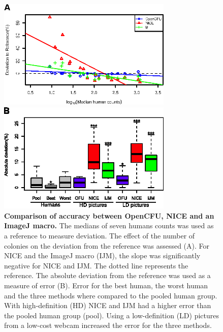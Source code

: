 \documentclass[10pt]{article}
\newcommand{\n}{seven}
\newcommand{\IJM}{IJM}
\begin{document}
\begin{figure}[!ht]
\begin{center}
\includegraphics[width=3.27in]{./figAccuracy/fig3A.eps}

\includegraphics[width=3.27in]{./figAccuracy/fig3B.eps}

\end{center}

\caption{{\bf Comparison of accuracy between OpenCFU, NICE\cite{clarke_lowcost_2010} and  an ImageJ macro\cite{cai_optimized_2011}.} 
The medians of \n{} humans counts was used as a reference to measure deviation. The effect of
the number of colonies on the deviation from the reference was assessed (A). For NICE and the ImageJ macro (\IJM), the
slope was significantly negative for NICE and \IJM{}. The dotted line represents the reference.
The absolute deviation from the reference was used as a measure of error (B). Error
for the best human, the worst human and the three methods where compared to the
pooled human group. With high-definition (HD) NICE and \IJM{} had a higher error than the pooled human
group (pool). Using a low-definition (LD) pictures from a low-cost webcam increased the error for the three methods.}
\label{figAccu}
\end{figure}


\newpage{}
\end{document}
